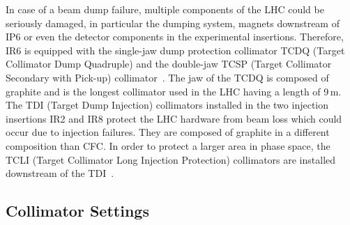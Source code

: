 In case of a beam dump failure, multiple components of the LHC could be seriously damaged, in particular the dumping system, magnets downstream of IP6 or even the detector components in the experimental insertions. Therefore, IR6 is equipped with the single-jaw dump protection collimator TCDQ (Target Collimator Dump Quadruple) and the double-jaw TCSP (Target Collimator Secondary with Pick-up) collimator~\cite{assmann:chamonixXIV}. The jaw of the TCDQ is composed of graphite and is the longest collimator used in the LHC having a length of 9$\,$m. 
 \newpage
The TDI (Target Dump Injection) collimators installed in the two injection insertions IR2 and IR8 protect the LHC hardware from beam loss which could occur due to injection failures. They are composed of graphite in a different composition than CFC. In order to protect a larger area in phase space, the TCLI (Target Collimator Long Injection Protection) collimators are installed downstream of the TDI~\citedr. 






\subsection{Collimator Settings}

